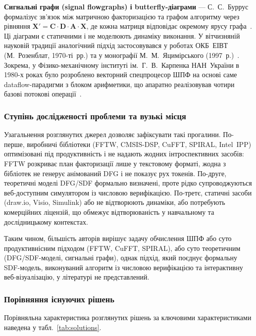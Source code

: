 \textbf{Сигнальні графи (signal flowgraphs) і butterfly-діаграми}
--- С.~С.~Буррус формалізує зв'язок між матричною факторизацією та
графом алгоритму через рівняння $\mathbf{X'} = \mathbf{C} \cdot
\mathbf{D} \cdot \mathbf{A} \cdot \mathbf{X}$, де кожна матриця
відповідає окремому ярусу графа~\cite{burrus1985dft}. Ці діаграми
є статичними і не моделюють динаміку виконання. У вітчизняній
науковій традиції аналогічний підхід застосовувався у роботах
ОКБ~ЕІВТ (М.~Розенблат, 1970-ті~рр.) та у монографії М.~М.~Яцимірського
(1997~р.)~\cite{protsko2025}. Зокрема, у Фізико-механічному
інституті ім.~Г.~В.~Карпенка НАН~України в 1980-х роках було
розроблено векторний спецпроцесор ШПФ на основі саме dataflow-парадигми
з блоком арифметики, що апаратно реалізовував чотири базові
потокові операції~\cite{protsko2025}.

\subsubsection*{Ступінь дослідженості проблеми та вузькі місця}

Узагальнення розглянутих джерел дозволяє зафіксувати такі
прогалини. По-перше, виробничі бібліотеки (FFTW, CMSIS-DSP,
CuFFT, SPIRAL, Intel~IPP) оптимізовані під продуктивність і не
надають жодних інтроспективних засобів: FFTW розкриває план
факторизації лише у текстовому форматі, жодна з бібліотек не
генерує анімований DFG і не показує рух токенів. По-друге, теоретичні
моделі DFG/SDF формально визначені, проте рідко супроводжуються
веб-доступним симулятором із числовою верифікацією. По-третє,
статичні засоби (draw.io, Visio, Simulink) або не відтворюють
динаміки, або потребують комерційних ліцензій, що обмежує
відтворюваність у навчальному та дослідницькому контекстах.

Таким чином, більшість авторів вирішує задачу обчислення ШПФ або
суто продуктивнісним підходом (FFTW, CuFFT, SPIRAL), або суто
теоретичним (DFG/SDF-моделі, сигнальні графи), однак підхід, який
поєднує формальну SDF-модель, виконуваний алгоритм із числовою
верифікацією та інтерактивну веб-візуалізацію, у літературі не
представлений.

\subsubsection*{Порівняння існуючих рішень}

Порівняльна характеристика розглянутих рішень за ключовими
характеристиками наведена у табл.~\ref{tab:solutions}.

